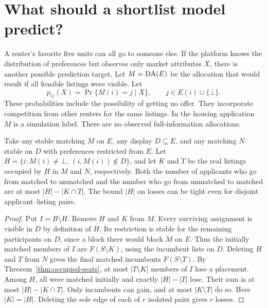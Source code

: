\section{What should a shortlist model predict?}\label{sec:prediction}
A renter's favorite five units can all go to someone else. If the platform knows the distribution of preferences but observes only market attributes $X$, there is another possible prediction target. Let $M=\operatorname{DA}(E)$ be the allocation that would result if all feasible listings were visible. Let
\[
   p_{ij}(X)=\Pr\{M(i)=j\mid X\},\qquad j\in E(i)\cup\{\bot\}.
\]
These probabilities include the possibility of getting no offer. They incorporate competition from other renters for the same listings. In the housing application $M$ is a simulation label. There are no observed full-information allocations.

\begin{theorem}\label{thm:omission}
Take any stable matching $M$ on $E$, any display $D\subseteq E$, and any matching $N$ stable on $D$ with preferences restricted from $E$. Let $H=\{i:M(i)\ne\bot,\ (i,M(i))\notin D\}$, and let $K$ and $T$ be the real listings occupied by $H$ in $M$ and $N$, respectively. Both the number of applicants who go from matched to unmatched and the number who go from unmatched to matched are at most $|H|-|K\cap T|$. The bound $|H|$ on losses can be tight even for disjoint applicant--listing pairs.
\end{theorem}
\begin{proof}
Put $I=B\setminus H$. Remove $H$ and $K$ from $M$. Every surviving assignment is visible in $D$ by definition of $H$. Its restriction is stable for the remaining participants on $D$, since a block there would block $M$ on $E$. Thus the initially matched members of $I$ are $F(S\setminus K)$, using the incumbent lists on $D$. Deleting $H$ and $T$ from $N$ gives the final matched incumbents $F(S\setminus T)$. By Theorem~\ref{thm:occupied-seats}, at most $|T\setminus K|$ members of $I$ lose a placement. Among $H$, all were matched initially and exactly $|H|-|T|$ lose. Their sum is at most $|H|-|K\cap T|$. Only incumbents can gain, and at most $|K\setminus T|$ do so. Here $|K|=|H|$. Deleting the sole edge of each of $r$ isolated pairs gives $r$ losses.
\end{proof}

